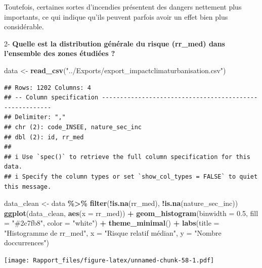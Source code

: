 \documentclass[
]{article}
\newenvironment{Shaded}{\begin{snugshade}}{\end{snugshade}}
\newcommand{\AttributeTok}[1]{\textcolor[rgb]{0.13,0.29,0.53}{#1}}
\newcommand{\FloatTok}[1]{\textcolor[rgb]{0.00,0.00,0.81}{#1}}
\newcommand{\FunctionTok}[1]{\textcolor[rgb]{0.13,0.29,0.53}{\textbf{#1}}}
\newcommand{\NormalTok}[1]{#1}
\newcommand{\OtherTok}[1]{\textcolor[rgb]{0.56,0.35,0.01}{#1}}
\newcommand{\SpecialCharTok}[1]{\textcolor[rgb]{0.81,0.36,0.00}{\textbf{#1}}}
\newcommand{\StringTok}[1]{\textcolor[rgb]{0.31,0.60,0.02}{#1}}
\begin{document}
Toutefois, certaines sortes d'incendies présentent des dangers nettement
plus importants, ce qui indique qu'ils peuvent parfois avoir un effet
bien plus considérable.

2- \textbf{Quelle est la distribution générale du risque (rr\_med) dans
l'ensemble des zones étudiées ?}

\begin{Shaded}
\begin{Highlighting}[]
\NormalTok{data }\OtherTok{\textless{}{-}} \FunctionTok{read\_csv}\NormalTok{(}\StringTok{"../Exports/export\_impactclimaturbanisation.csv"}\NormalTok{)}
\end{Highlighting}
\end{Shaded}

\begin{verbatim}
## Rows: 1202 Columns: 4
## -- Column specification --------------------------------------------------------
## Delimiter: ","
## chr (2): code_INSEE, nature_sec_inc
## dbl (2): id, rr_med
## 
## i Use `spec()` to retrieve the full column specification for this data.
## i Specify the column types or set `show_col_types = FALSE` to quiet this message.
\end{verbatim}

\begin{Shaded}
\begin{Highlighting}[]
\NormalTok{data\_clean }\OtherTok{\textless{}{-}}\NormalTok{ data }\SpecialCharTok{\%\textgreater{}\%}
  \FunctionTok{filter}\NormalTok{(}\SpecialCharTok{!}\FunctionTok{is.na}\NormalTok{(rr\_med), }\SpecialCharTok{!}\FunctionTok{is.na}\NormalTok{(nature\_sec\_inc))}
\FunctionTok{ggplot}\NormalTok{(data\_clean, }\FunctionTok{aes}\NormalTok{(}\AttributeTok{x =}\NormalTok{ rr\_med)) }\SpecialCharTok{+}
  \FunctionTok{geom\_histogram}\NormalTok{(}\AttributeTok{binwidth =} \FloatTok{0.5}\NormalTok{, }\AttributeTok{fill =} \StringTok{"\#2c7fb8"}\NormalTok{, }\AttributeTok{color =} \StringTok{"white"}\NormalTok{) }\SpecialCharTok{+}
  \FunctionTok{theme\_minimal}\NormalTok{() }\SpecialCharTok{+}
  \FunctionTok{labs}\NormalTok{(}\AttributeTok{title =} \StringTok{"Histogramme de rr\_med"}\NormalTok{,}
       \AttributeTok{x =} \StringTok{"Risque relatif médian"}\NormalTok{,}
       \AttributeTok{y =} \StringTok{"Nombre d\textquotesingle{}occurrences"}\NormalTok{)}
\end{Highlighting}
\end{Shaded}

\texttt{[image: Rapport\_files/figure-latex/unnamed-chunk-58-1.pdf]}
\end{document}
